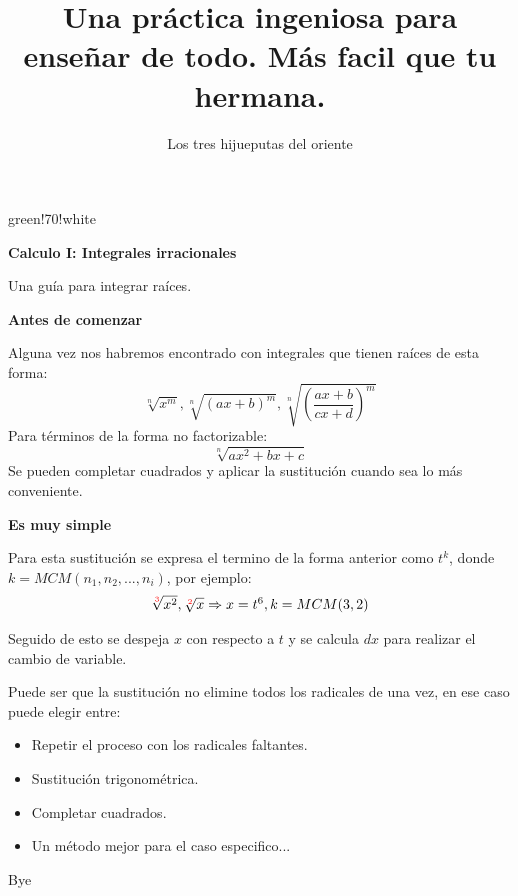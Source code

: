 \documentclass{article}
\title{Una práctica ingeniosa para enseñar de todo. Más facil que tu hermana.}
\author{Los tres hijueputas del oriente}
\newenvironment{formula-box}{
	\begin{tcolorbox}[
		colframe=black, %
		colback=white, %
		arc=1mm, %
		boxrule=1pt, %
		left=2mm, %
		right=2mm, %
		top=2mm, %
		bottom=2mm, %
		]
	}{
	\end{tcolorbox}
}
\newenvironment{title-box}[1]{
	\begin{tcolorbox}[
		colframe=white, %
		colback=white, %
		arc=1mm, %
		left=2mm, %
		right=2mm, %
		top=2mm, %
		bottom=2mm, %
		borderline={0.5mm}{0mm}{#1,dashed},
		enhanced,
		boxrule=0.5mm,
		]
	}{
	\end{tcolorbox}
}
\begin{document}
	
	
	\begin{multicols}{2}
		\begin{title-box}{green!70!white}
			{\raggedright \large \textbf{Calculo I: Integrales irracionales} \par}
			
			\vspace{2mm}
			
			\begin{title-sign}\end{title-sign}
			
			\vspace{5mm}
			
			 Una guía para integrar raíces. 
		\end{title-box}
		
		\vfill
		
		\begin{formula-box}
			{\raggedright \large \textbf{Antes de comenzar} \par}
			
			Alguna vez nos habremos encontrado con integrales que tienen raíces de esta forma:
			\[
			\sqrt[n]{x^m}, \sqrt[n]{(ax+b)^m}, \sqrt[n]{( \frac{ax+b}{cx+d} )^m}
			\]
			Para términos de la forma no factorizable:
			\[
			\sqrt[n]{ax^2+bx+c}
			\]
			Se pueden completar cuadrados y aplicar la sustitución cuando sea lo más conveniente.
		\end{formula-box}
		
		\begin{formula-box}
			{\raggedright \large \textbf{Es muy simple} \par}
			
			Para esta sustitución se expresa el termino de la forma anterior como $t^k$, donde $k = MCM(n_1,n_2,...,n_i)$, por ejemplo:
			\[
			\begin{array}{c}
				\sqrt[\color{red} 3]{x^2}, \sqrt[\color{red} 2]{x} \Rightarrow x = t^6, k = MCM(3,2)
			\end{array}
			\]
			
			Seguido de esto se despeja $x$ con respecto a $t$ y se calcula $dx$ para realizar el cambio de variable. \par
			\vspace{2mm}
			Puede ser que la sustitución no elimine todos los radicales de una vez, en ese caso puede elegir entre:
			\begin{itemize}
				\item Repetir el proceso con los radicales faltantes.
				\item Sustitución trigonométrica.
				\item Completar cuadrados.
				\item Un método mejor para el caso especifico...
			\end{itemize}
		\end{formula-box}
		
		\columnbreak
		
		Bye
	\end{multicols}
	
\end{document}
